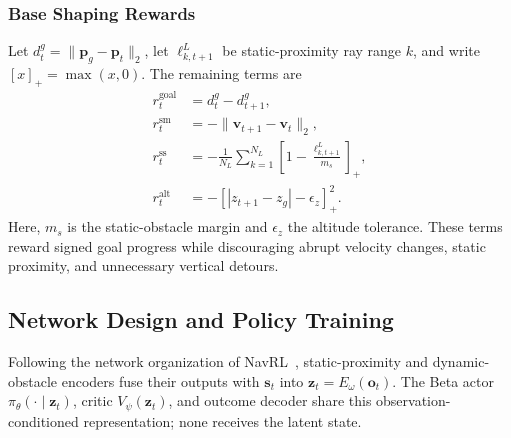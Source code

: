 \documentclass[letterpaper, 10 pt, conference]{ieeeconf}
\begin{document}
\subsubsection{Base Shaping Rewards}
Let \(d_t^g=\|\mathbf{p}_g-\mathbf{p}_t\|_2\), let \(\ell_{k,t+1}^{L}\) be static-proximity ray range \(k\), and write \([x]_+=\max(x,0)\). The remaining terms are
\begin{equation}
	\begin{aligned}
	r_t^{\mathrm{goal}}&=d_t^g-d_{t+1}^g,\\
	r_t^{\mathrm{sm}}&=-\|\mathbf{v}_{t+1}-\mathbf{v}_t\|_2,\\
	r_t^{\mathrm{ss}}&=-\frac{1}{N_L}\sum_{k=1}^{N_L}
	\left[1-\frac{\ell_{k,t+1}^{L}}{m_s}\right]_+,\\
	r_t^{\mathrm{alt}}&=-[|z_{t+1}-z_g|-\epsilon_z]_+^2.
	\end{aligned}
	\label{eq:base_rewards}
\end{equation}
Here, \(m_s\) is the static-obstacle margin and \(\epsilon_z\) the altitude tolerance. These terms reward signed goal progress while discouraging abrupt velocity changes, static proximity, and unnecessary vertical detours.

\subsection{Network Design and Policy Training}\label{subsec:network}
Following the network organization of NavRL~\cite{navrl}, static-proximity and dynamic-obstacle encoders fuse their outputs with \(\mathbf{s}_t\) into \(\mathbf{z}_t=E_\omega(\mathbf{o}_t)\). The Beta actor \(\pi_\theta(\cdot\mid\mathbf{z}_t)\), critic \(V_\psi(\mathbf{z}_t)\), and outcome decoder share this observation-conditioned representation; none receives the latent state.
\end{document}
